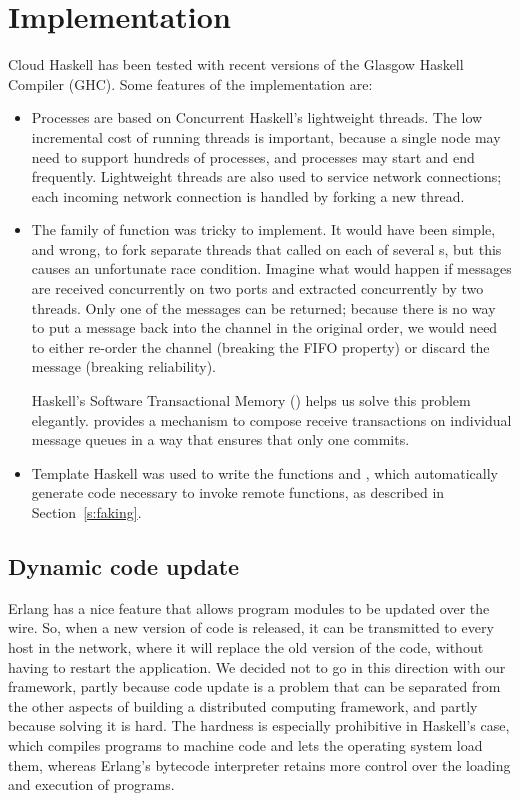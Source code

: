 \documentclass[preprint]{sigplanconf}
\begin{document}

\section{Implementation}
\label{s:Implementation}
Cloud Haskell has been tested with recent versions of the Glasgow Haskell Compiler (GHC). 
Some features of the implementation are:

\begin{itemize}
\item Processes are based on Concurrent Haskell's lightweight threads. The low incremental cost of running threads is important, because a single node may need to support hundreds of processes, and processes may start and end frequently. Lightweight threads are also used to service network connections; 
each incoming network connection is handled by forking a new thread.
\item The  family of function was tricky to implement. It would have been simple, and wrong, to fork separate threads that called  on each of several s, but this causes an unfortunate race condition. 
Imagine what would happen if messages are received concurrently on two ports and extracted concurrently by two threads. Only one of the messages can be returned;  because there is no way to put a message back into the channel in the original order, we would need to either re-order the channel (breaking the FIFO property) or discard the message (breaking reliability).

Haskell's Software Transactional Memory () helps us solve this problem elegantly.
 provides a mechanism to compose receive transactions on individual message queues in a way that ensures that only one commits.
\item Template Haskell was used to write the functions  and , which automatically generate code necessary to invoke remote functions, as described in Section~\ref{s:faking}.
\end{itemize}

\subsection{Dynamic code update} \label{s:code-update}

Erlang has a nice feature that allows program modules to be updated over the wire. So, when a new version of code is released, it can be transmitted to every host in the network, where it will replace the old version of the code, without having to restart the application. We decided not to go in this direction with our framework, partly because code update is a problem that can be separated from the other aspects of building a distributed computing framework, and partly because solving it is hard. The hardness is especially prohibitive in Haskell's case, which compiles programs to machine code and lets the operating system load them, whereas Erlang's bytecode interpreter retains more control over the loading and execution of programs.
\end{document}
